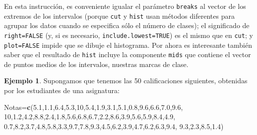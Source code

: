 \documentclass[
]{book}
\newenvironment{Shaded}{\begin{snugshade}}{\end{snugshade}}
\newcommand{\DataTypeTok}[1]{\textcolor[rgb]{0.13,0.29,0.53}{#1}}
\newcommand{\DecValTok}[1]{\textcolor[rgb]{0.00,0.00,0.81}{#1}}
\newcommand{\FloatTok}[1]{\textcolor[rgb]{0.00,0.00,0.81}{#1}}
\newcommand{\KeywordTok}[1]{\textcolor[rgb]{0.13,0.29,0.53}{\textbf{#1}}}
\newcommand{\NormalTok}[1]{#1}
\newcommand{\OperatorTok}[1]{\textcolor[rgb]{0.81,0.36,0.00}{\textbf{#1}}}
\newcommand{\OtherTok}[1]{\textcolor[rgb]{0.56,0.35,0.01}{#1}}
\theoremstyle{definition}
\theoremstyle{definition}
\newtheorem{example}{Ejemplo}[chapter]
\theoremstyle{definition}
\theoremstyle{remark}
\begin{document}
\begin{Shaded}
\end{Shaded}

En esta instrucción, es conveniente igualar el parámetro \texttt{breaks} al vector de los extremos de los intervalos (porque \texttt{cut} y \texttt{hist} usan métodos diferentes para agrupar los datos cuando se especifica sólo el número de clases); el significado de \texttt{right=FALSE} (y, si es necesario, \texttt{include.lowest=TRUE}) es el mismo que en \texttt{cut}; y \texttt{plot=FALSE} impide que se dibuje el histograma. Por ahora es interesante también saber que el resultado de \texttt{hist} incluye la componente \texttt{mids} que contiene el vector de puntos medios de los intervalos, nuestras marcas de clase.

\begin{example}
\protect\hypertarget{exm:notes}{}{\label{exm:notes} }Supongamos que tenemos las 50 calificaciones siguientes, obtenidas por los estudiantes de una asignatura:
\end{example}

\begin{Shaded}
\begin{Highlighting}[]
\NormalTok{Notas=}\KeywordTok{c}\NormalTok{(}\FloatTok{5.1}\NormalTok{,}\FloatTok{1.1}\NormalTok{,}\FloatTok{6.4}\NormalTok{,}\FloatTok{5.3}\NormalTok{,}\DecValTok{10}\NormalTok{,}\FloatTok{5.4}\NormalTok{,}\FloatTok{1.9}\NormalTok{,}\FloatTok{3.1}\NormalTok{,}\FloatTok{5.1}\NormalTok{,}\FloatTok{0.8}\NormalTok{,}\FloatTok{9.6}\NormalTok{,}\FloatTok{6.6}\NormalTok{,}\FloatTok{7.0}\NormalTok{,}\FloatTok{9.6}\NormalTok{,}
  \DecValTok{10}\NormalTok{,}\FloatTok{1.2}\NormalTok{,}\FloatTok{4.2}\NormalTok{,}\FloatTok{8.8}\NormalTok{,}\FloatTok{2.4}\NormalTok{,}\FloatTok{1.8}\NormalTok{,}\FloatTok{5.6}\NormalTok{,}\FloatTok{6.8}\NormalTok{,}\FloatTok{6.7}\NormalTok{,}\FloatTok{2.2}\NormalTok{,}\FloatTok{8.6}\NormalTok{,}\FloatTok{3.9}\NormalTok{,}\FloatTok{5.6}\NormalTok{,}\FloatTok{5.9}\NormalTok{,}\FloatTok{8.4}\NormalTok{,}\FloatTok{4.9}\NormalTok{,}
  \FloatTok{0.7}\NormalTok{,}\FloatTok{8.2}\NormalTok{,}\FloatTok{3.7}\NormalTok{,}\FloatTok{4.8}\NormalTok{,}\FloatTok{5.8}\NormalTok{,}\FloatTok{3.3}\NormalTok{,}\FloatTok{9.7}\NormalTok{,}\FloatTok{7.8}\NormalTok{,}\FloatTok{9.3}\NormalTok{,}\FloatTok{4.5}\NormalTok{,}\FloatTok{6.2}\NormalTok{,}\FloatTok{3.9}\NormalTok{,}\FloatTok{4.7}\NormalTok{,}\FloatTok{6.2}\NormalTok{,}\FloatTok{6.3}\NormalTok{,}\FloatTok{9.4}\NormalTok{,}
  \FloatTok{9.3}\NormalTok{,}\FloatTok{2.3}\NormalTok{,}\FloatTok{8.5}\NormalTok{,}\FloatTok{1.4}\NormalTok{)}
\end{Highlighting}
\end{Shaded}
\end{document}
